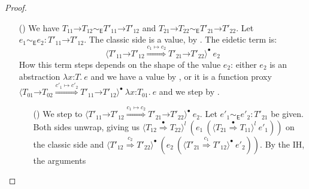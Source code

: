 \documentclass[9pt]{extarticle}
\newcommand{\ottnt}[1]{\mathit{#1}}
\begin{document}
\begin{lemma}
\begin{proof}
{\begin{itemize}
    \item[(\A{Fun})] We have $  \ottnt{T_{{\mathrm{11}}}} \mathord{ \rightarrow } \ottnt{T_{{\mathrm{12}}}}    \sim _{  \mathsf{E}  }   \ottnt{T'_{{\mathrm{11}}}} \mathord{ \rightarrow } \ottnt{T'_{{\mathrm{12}}}}  $
      and $  \ottnt{T_{{\mathrm{21}}}} \mathord{ \rightarrow } \ottnt{T_{{\mathrm{22}}}}    \sim _{  \mathsf{E}  }   \ottnt{T'_{{\mathrm{21}}}} \mathord{ \rightarrow } \ottnt{T'_{{\mathrm{22}}}}  $. Let $ \ottnt{e_{{\mathrm{1}}}}   \sim _{  \mathsf{E}  }  \ottnt{e_{{\mathrm{2}}}}  :   \ottnt{T'_{{\mathrm{11}}}} \mathord{ \rightarrow } \ottnt{T'_{{\mathrm{12}}}}  $. The classic side is a value, by . The
      eidetic \lambdah term is: \[  \langle   \ottnt{T'_{{\mathrm{11}}}} \mathord{ \rightarrow } \ottnt{T'_{{\mathrm{12}}}}   \mathord{ \overset{ \ottnt{c_{{\mathrm{1}}}}  \mapsto  \ottnt{c_{{\mathrm{2}}}} }{\Rightarrow} }   \ottnt{T'_{{\mathrm{21}}}} \mathord{ \rightarrow } \ottnt{T'_{{\mathrm{22}}}}   \rangle^{\bullet} ~  \ottnt{e_{{\mathrm{2}}}}  \] How this term steps depends on the shape of the value
      $\ottnt{e_{{\mathrm{2}}}}$: either $\ottnt{e_{{\mathrm{2}}}}$ is an abstraction $ \lambda \mathit{x} \mathord{:} \ottnt{T} .~  \ottnt{e} $ and we
      have a value by , or it is a function proxy
      $ \langle   \ottnt{T_{{\mathrm{01}}}} \mathord{ \rightarrow } \ottnt{T_{{\mathrm{02}}}}   \mathord{ \overset{ \ottnt{c'_{{\mathrm{1}}}}  \mapsto  \ottnt{c'_{{\mathrm{2}}}} }{\Rightarrow} }   \ottnt{T'_{{\mathrm{11}}}} \mathord{ \rightarrow } \ottnt{T'_{{\mathrm{12}}}}   \rangle^{\bullet} ~   \lambda \mathit{x} \mathord{:} \ottnt{T_{{\mathrm{01}}}} .~  \ottnt{e}  $ and we step
      by \ECastMerge.
\begin{itemize}
      \item[(\V{ProxyE})] We step to
        $ \langle   \ottnt{T'_{{\mathrm{11}}}} \mathord{ \rightarrow } \ottnt{T'_{{\mathrm{12}}}}   \mathord{ \overset{ \ottnt{c_{{\mathrm{1}}}}  \mapsto  \ottnt{c_{{\mathrm{2}}}} }{\Rightarrow} }   \ottnt{T'_{{\mathrm{21}}}} \mathord{ \rightarrow } \ottnt{T'_{{\mathrm{22}}}}   \rangle^{\bullet} ~  \ottnt{e_{{\mathrm{2}}}} $.  Let $ \ottnt{e'_{{\mathrm{1}}}}   \sim _{  \mathsf{E}  }  \ottnt{e'_{{\mathrm{2}}}}  :  \ottnt{T'_{{\mathrm{21}}}} $ be given. Both sides unwrap, giving us $ \langle  \ottnt{T_{{\mathrm{12}}}}  \mathord{ \overset{\bullet}{\Rightarrow} }  \ottnt{T_{{\mathrm{22}}}}  \rangle^{ \ottnt{l} } ~   (  \ottnt{e_{{\mathrm{1}}}} ~  (  \langle  \ottnt{T_{{\mathrm{21}}}}  \mathord{ \overset{\bullet}{\Rightarrow} }  \ottnt{T_{{\mathrm{11}}}}  \rangle^{ \ottnt{l} } ~  \ottnt{e'_{{\mathrm{1}}}}  )   )  $ on the classic side and $ \langle  \ottnt{T'_{{\mathrm{12}}}}  \mathord{ \overset{ \ottnt{c_{{\mathrm{2}}}} }{\Rightarrow} }  \ottnt{T'_{{\mathrm{22}}}}  \rangle^{\bullet} ~   (  \ottnt{e_{{\mathrm{2}}}} ~  (  \langle  \ottnt{T'_{{\mathrm{21}}}}  \mathord{ \overset{ \ottnt{c_{{\mathrm{1}}}} }{\Rightarrow} }  \ottnt{T'_{{\mathrm{12}}}}  \rangle^{\bullet} ~  \ottnt{e'_{{\mathrm{2}}}}  )   )  $. By the IH, the arguments

\end{itemize}
\end{itemize}}
\end{proof}
\end{lemma}
\end{document}
